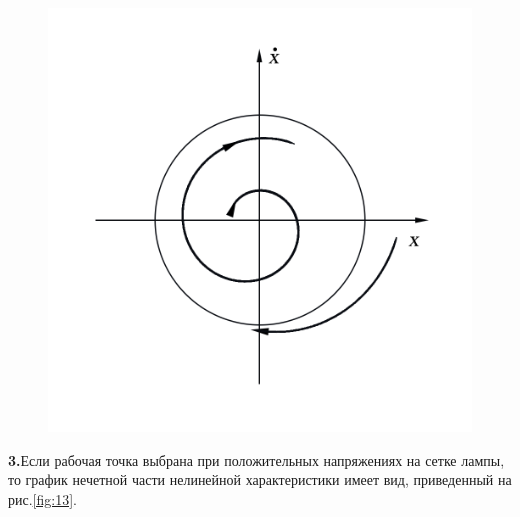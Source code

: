\begin{center}
\begin{figure}[h!]
\begin{minipage}{0.32\linewidth}
        \vspace{-30pt}
        \label{fig:11}
    \end{minipage}
    \begin{minipage}{0.32\linewidth}
        \includegraphics[width=\linewidth]{photo/pics/Ris10c.png}
        \vspace{-30pt}
        \label{fig:12}
    \end{minipage}
    \caption{}
    \vspace{-40pt}
    \end{figure}
\end{center} 
{\bfseries 3.}Если рабочая точка выбрана при положительных напряжениях на сетке лампы, то график нечетной части нелинейной характеристики имеет вид, приведенный на рис.\ref{fig:13}.
